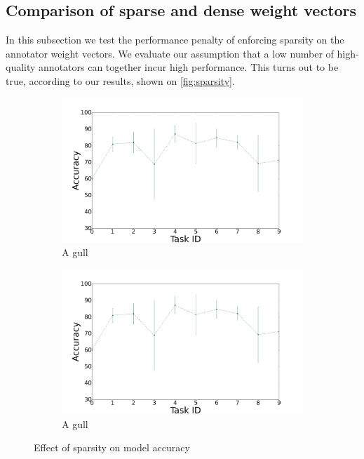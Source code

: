 \documentclass{llncs}
\begin{document}
\subsection{Comparison of sparse and dense weight vectors}

In this subsection we test the performance penalty of enforcing sparsity on the annotator weight vectors. We evaluate our assumption that a low number of high-quality annotators can together incur high performance. This turns out to be true, according to our results, shown on \autoref{fig:sparsity}.

\begin{figure}[!htb]
    \centering
    \begin{subfigure}[b]{0.45\textwidth}
        \includegraphics[width=\textwidth]{figures/plot_mlp}
        \caption{A gull}
    \end{subfigure}
    \begin{subfigure}[b]{0.45\textwidth}
        \includegraphics[width=\textwidth]{figures/plot_mlp}
        \caption{A gull}
    \end{subfigure}
    \caption{Effect of sparsity on model accuracy}
    \label{fig:sparsity}
\end{figure}
\end{document}
